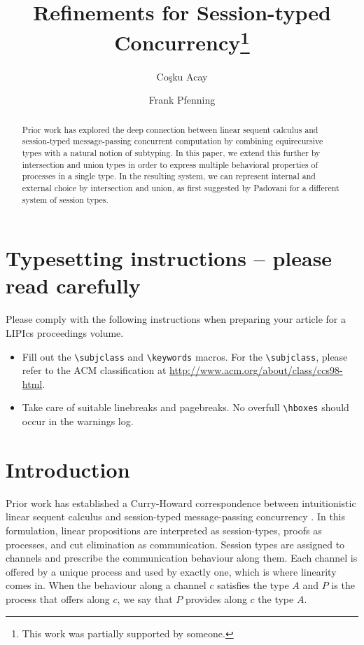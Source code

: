\documentclass[a4paper,USenglish]{lipics-v2016}
\title{Refinements for Session-typed Concurrency\footnote{This work was partially supported by someone.}}
\author[1]{Co\c{s}ku Acay}
\author[2]{Frank Pfenning}
\affil[1]{Carnegie Mellon University, Pittsburgh, PA 15213 \\
  \texttt{cacay@cmu.edu}}
\affil[2]{Carnegie Mellon University, Pittsburgh, PA 15213 \\
  \texttt{fp@cs.cmu.edu}}
\begin{document}
\maketitle

\begin{abstract}
Prior work has explored the deep connection between linear sequent calculus and session-typed message-passing concurrent computation by combining equirecursive types with a natural notion of subtyping. In this paper, we extend this further by intersection and union types in order to express multiple behavioral properties of processes in a single type. In the resulting system, we can represent internal and external choice by intersection and union, as first suggested by Padovani for a different system of session types.
\end{abstract}


\section{Typesetting instructions -- please read carefully}
Please comply with the following instructions when preparing your article for a LIPIcs proceedings volume. 
\begin{itemize}
\item Fill out the \verb+\subjclass+ and \verb+\keywords+ macros. For the \verb+\subjclass+, please refer to the ACM classification at \url{http://www.acm.org/about/class/ccs98-html}.
\item Take care of suitable linebreaks and pagebreaks. No overfull \verb+\hboxes+ should occur in the warnings log.
\end{itemize}


\section{Introduction}

Prior work has established a Curry-Howard correspondence between intuitionistic linear sequent calculus and session-typed message-passing concurrency \cite{CairesP10, PfenningG15, Honda93}. In this formulation, linear propositions are interpreted as session-types, proofs as processes, and cut elimination as communication. Session types are assigned to channels and prescribe the communication behaviour along them. Each channel is offered by a unique process and used by exactly one, which is where linearity comes in. When the behaviour along a channel $c$ satisfies the type $A$ and $P$ is the process that offers along $c$, we say that $P$ provides along $c$ the type $A$.
\end{document}
